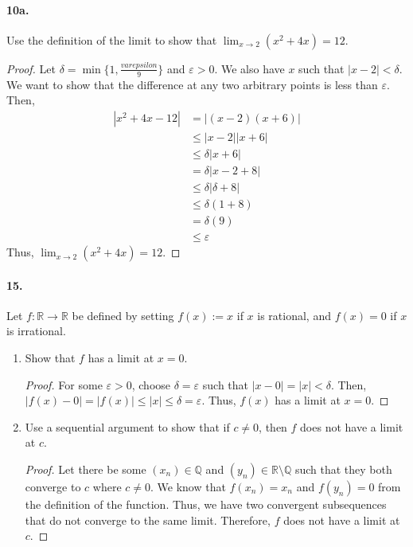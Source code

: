 \documentclass[12pt]{article}
\newcommand\R{\mathbb{R}}
\newcommand\Q{\mathbb{Q}}
\theoremstyle{remark}
\begin{document}
\paragraph{10a.} Use the definition of the limit to show that $\lim_{x \to 2} (x^2 + 4x) = 12$.
\begin{proof}
    Let $\delta = \min\{1, \frac{varepsilon}{9}\}$ and $\varepsilon > 0$. We also have $x$ such that $|x - 2| < \delta$. We want to show that the difference at any two arbitrary points is less than $\varepsilon$. Then,
    \begin{align*}
        |x^2 + 4x - 12| &= |(x - 2)(x + 6)| \\
        &\leq |x - 2||x + 6| \\
        &\leq \delta|x + 6| \\
        &= \delta|x - 2 + 8| \\
        &\leq \delta|\delta + 8| \\
        &\leq \delta(1 + 8) \\
        &= \delta(9) \\
        &\leq \varepsilon
    \end{align*}
    Thus, $\lim_{x \to 2} (x^2 + 4x) = 12$.
\end{proof}

\paragraph{15.} Let $f: \R \to \R$ be defined by setting $f(x) := x$ if $x$ is rational, and $f(x) = 0$ if $x$ is irrational.
\begin{enumerate}[label=(\alph*)]
    \item Show that $f$ has a limit at $x = 0$.
    \begin{proof}
        For some $\varepsilon > 0$, choose $\delta = \varepsilon$ such that $|x - 0| = |x| < \delta$. Then, $|f(x) - 0| = |f(x)| \leq |x| \leq \delta = \varepsilon$. Thus, $f(x)$ has a limit at $x = 0$.
    \end{proof}

    \item Use a sequential argument to show that if $c \neq 0$, then $f$ does not have a limit at $c$.
    \begin{proof}
        Let there be some $(x_n) \in \Q$ and $(y_n) \in \R \setminus \Q$ such that they both converge to $c$ where $c \neq 0$. We know that $f(x_n) = x_n$ and $f(y_n) = 0$ from the definition of the function. Thus, we have two convergent subsequences that do not converge to the same limit. Therefore, $f$ does not have a limit at $c$.
    \end{proof}
\end{enumerate}
\end{document}
